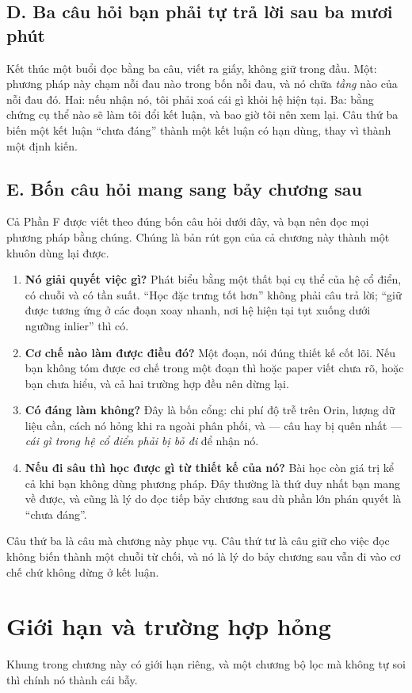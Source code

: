 \documentclass[../../deep_learning.tex]{subfiles}
\begin{document}
\subsection{D. Ba câu hỏi bạn phải tự trả lời sau ba mươi phút}
Kết thúc một buổi đọc bằng ba câu, viết ra giấy, không giữ trong đầu. Một: phương pháp này chạm nỗi đau nào trong bốn nỗi đau, và nó chữa \emph{tầng} nào của nỗi đau đó. Hai: nếu nhận nó, tôi phải xoá cái gì khỏi hệ hiện tại. Ba: bằng chứng cụ thể nào sẽ làm tôi đổi kết luận, và bao giờ tôi nên xem lại. Câu thứ ba biến một kết luận ``chưa đáng'' thành một kết luận có hạn dùng, thay vì thành một định kiến.

\subsection{E. Bốn câu hỏi mang sang bảy chương sau}
Cả Phần F được viết theo đúng bốn câu hỏi dưới đây, và bạn nên đọc mọi phương pháp bằng chúng. Chúng là bản rút gọn của cả chương này thành một khuôn dùng lại được.

\begin{enumerate}
\item \textbf{Nó giải quyết việc gì?} Phát biểu bằng một thất bại cụ thể của hệ cổ điển, có chuỗi và có tần suất. ``Học đặc trưng tốt hơn'' không phải câu trả lời; ``giữ được tương ứng ở các đoạn xoay nhanh, nơi hệ hiện tại tụt xuống dưới ngưỡng inlier'' thì có.
\item \textbf{Cơ chế nào làm được điều đó?} Một đoạn, nói đúng thiết kế cốt lõi. Nếu bạn không tóm được cơ chế trong một đoạn thì hoặc paper viết chưa rõ, hoặc bạn chưa hiểu, và cả hai trường hợp đều nên dừng lại.
\item \textbf{Có đáng làm không?} Đây là bốn cổng: chi phí độ trễ trên Orin, lượng dữ liệu cần, cách nó hỏng khi ra ngoài phân phối, và --- câu hay bị quên nhất --- \emph{cái gì trong hệ cổ điển phải bị bỏ đi} để nhận nó.
\item \textbf{Nếu đi sâu thì học được gì từ thiết kế của nó?} Bài học còn giá trị kể cả khi bạn không dùng phương pháp. Đây thường là thứ duy nhất bạn mang về được, và cũng là lý do đọc tiếp bảy chương sau dù phần lớn phán quyết là ``chưa đáng''.
\end{enumerate}

Câu thứ ba là câu mà chương này phục vụ. Câu thứ tư là câu giữ cho việc đọc không biến thành một chuỗi từ chối, và nó là lý do bảy chương sau vẫn đi vào cơ chế chứ không dừng ở kết luận.

\section{Giới hạn và trường hợp hỏng}
Khung trong chương này có giới hạn riêng, và một chương bộ lọc mà không tự soi thì chính nó thành cái bẫy.
\end{document}
